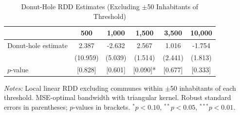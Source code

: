 \begin{table}[t]
\centering
\caption{Donut-Hole RDD Estimates (Excluding $\pm$50 Inhabitants of Threshold)}
\label{tab:donut}
\begin{tabular}{lccccc}
\hline\hline
 & 500 & 1,000 & 1,500 & 3,500 & 10,000 \\
\hline
Donut-hole estimate & 2.387 & -2.632 & 2.567 & 1.016 & -1.754 \\
 & (10.959) & (5.039) & (1.514) & (2.441) & (1.813) \\
$p$-value & [0.828] & [0.601] & [0.090]* & [0.677] & [0.333] \\
\hline\hline
\end{tabular}
\begin{tablenotes}\small
\item \textit{Notes:} Local linear RDD excluding communes within $\pm$50 inhabitants of each threshold. MSE-optimal bandwidth with triangular kernel. Robust standard errors in parentheses; $p$-values in brackets. $^{*}p<0.10$, $^{**}p<0.05$, $^{***}p<0.01$.
\end{tablenotes}
\end{table}
